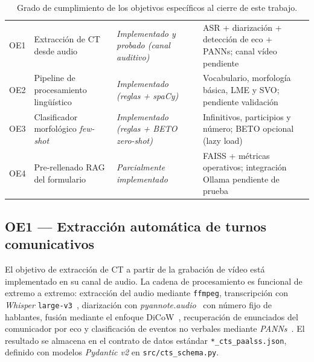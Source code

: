 \begin{table}[ht]
  \footnotesize
  \renewcommand{\arraystretch}{1.3}
  \setlength{\tabcolsep}{4pt}
  \begin{center}
  \begin{tabular}{|L{1.2cm}|L{3.5cm}|L{3.5cm}|L{5.2cm}|}
  \hline
   &  &  &  \\ \hline
  OE1 & Extracción de \ac{CT} desde audio
      & \emph{Implementado y probado (canal auditivo)}
      & ASR + diarización + detección de eco + PANNs; canal vídeo pendiente \\ \hline
  OE2 & Pipeline de procesamiento lingüístico
      & \emph{Implementado (reglas + spaCy)}
      & Vocabulario, morfología básica, \ac{LME} y \ac{SVO}; pendiente validación \\ \hline
  OE3 & Clasificador morfológico \emph{few-shot}
      & \emph{Implementado (reglas + BETO \emph{zero-shot})}
      & Infinitivos, participios y número; BETO opcional (lazy load) \\ \hline
  OE4 & Pre-rellenado \ac{RAG} del formulario
      & \emph{Parcialmente implementado}
      & FAISS + métricas operativos; integración Ollama pendiente de prueba \\ \hline
  \end{tabular}
  \end{center}
  \caption[Cumplimiento de objetivos específicos]{Grado de cumplimiento de los objetivos
    específicos al cierre de este trabajo.}
  \label{tab:cumplimiento}
  \renewcommand{\arraystretch}{1}
\end{table}

\subsection{OE1 — Extracción automática de turnos comunicativos}
\label{subsec:conc_oe1}

El objetivo de extracción de \ac{CT} a partir de la grabación de vídeo está
implementado en su canal de audio. La cadena de procesamiento es funcional de extremo
a extremo: extracción del audio mediante \texttt{ffmpeg}, transcripción con
\emph{Whisper} \texttt{large-v3}~\cite{whisper_radford2023}, diarización con
\emph{pyannote.audio}~\cite{pyannote_plaquet2023} con número fijo de hablantes, fusión
mediante el enfoque DiCoW~\cite{dicow_diarization}, recuperación de enunciados del
comunicador por eco y clasificación de eventos no verbales mediante
\emph{PANNs}~\cite{pyannote_plaquet2023}. El resultado se almacena en el contrato
de datos estándar \texttt{*\_cts\_paalss.json}, definido con modelos \emph{Pydantic v2}
en \texttt{src/cts\_schema.py}.

